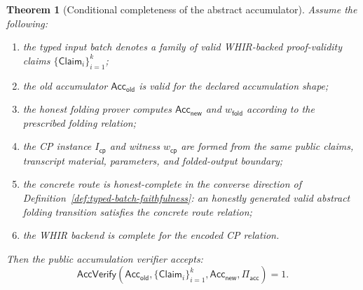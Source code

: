 \documentclass[11pt]{article}
\newtheorem{theorem}{Theorem}[section]
\theoremstyle{definition}
\newcommand{\Acc}{\mathsf{Acc}}
\begin{document}
\begin{theorem}[Conditional completeness of the abstract accumulator]
Assume the following:
\begin{enumerate}
  \item the typed input batch denotes a family of valid WHIR-backed
        proof-validity claims $\{\mathsf{Claim}_i\}_{i=1}^k$;
  \item the old accumulator $\Acc_{\mathsf{old}}$ is valid for the declared
        accumulation shape;
  \item the honest folding prover computes $\Acc_{\mathsf{new}}$ and
        $w_{\mathsf{fold}}$ according to the prescribed folding relation;
  \item the CP instance $I_{\mathsf{cp}}$ and witness $w_{\mathsf{cp}}$ are
        formed from the same public claims, transcript material, parameters,
        and folded-output boundary;
  \item the concrete route is honest-complete in the converse direction of
        Definition~\ref{def:typed-batch-faithfulness}: an honestly generated
        valid abstract folding transition satisfies the concrete route relation;
  \item the WHIR backend is complete for the encoded CP relation.
\end{enumerate}
Then the public accumulation verifier accepts:
\[
  \mathsf{AccVerify}
  \left(
    \Acc_{\mathsf{old}},
    \{\mathsf{Claim}_i\}_{i=1}^k,
    \Acc_{\mathsf{new}},
    \Pi_{\mathsf{acc}}
  \right)=1.
\]
\end{theorem}
\end{document}
